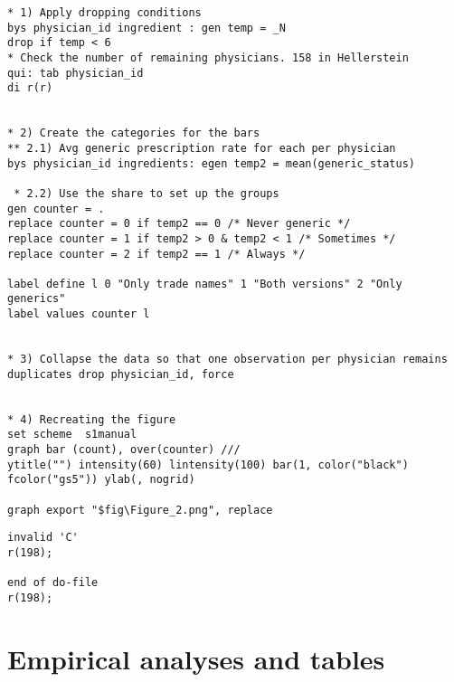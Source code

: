 \documentclass[
]{book}
\begin{document}
\begin{verbatim}
* 1) Apply dropping conditions
bys physician_id ingredient : gen temp = _N
drop if temp < 6
* Check the number of remaining physicians. 158 in Hellerstein
qui: tab physician_id
di r(r)


* 2) Create the categories for the bars
** 2.1) Avg generic prescription rate for each per physician
bys physician_id ingredients: egen temp2 = mean(generic_status) 

 * 2.2) Use the share to set up the groups
gen counter = .
replace counter = 0 if temp2 == 0 /* Never generic */
replace counter = 1 if temp2 > 0 & temp2 < 1 /* Sometimes */
replace counter = 2 if temp2 == 1 /* Always */

label define l 0 "Only trade names" 1 "Both versions" 2 "Only generics"
label values counter l


* 3) Collapse the data so that one observation per physician remains
duplicates drop physician_id, force


* 4) Recreating the figure
set scheme  s1manual
graph bar (count), over(counter) ///
ytitle("") intensity(60) lintensity(100) bar(1, color("black") fcolor("gs5")) ylab(, nogrid)

graph export "$fig\Figure_2.png", replace
\end{verbatim}

\begin{verbatim}
invalid 'C' 
r(198);

end of do-file
r(198);
\end{verbatim}

\hypertarget{A3}{%
\section{Empirical analyses and tables}\label{A3}}
\end{document}
